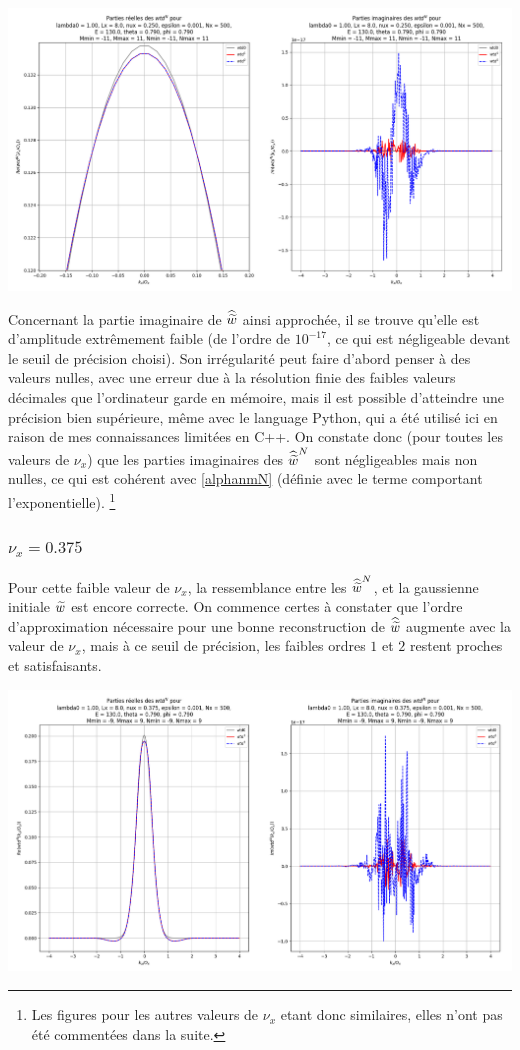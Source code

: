 \includegraphics[scale=0.35]{1-1.png}

\newpage

Concernant la partie imaginaire de $\widehat{\widetilde{w}}$ ainsi approchée, il se trouve qu'elle est d'amplitude extrêmement faible
(de l'ordre de $10^{-17}$, ce qui est négligeable devant le seuil de précision choisi). Son irrégularité peut faire
d'abord penser à des valeurs nulles, avec une erreur due à la résolution finie des faibles valeurs décimales
que l'ordinateur garde en mémoire,
mais il est possible d'atteindre une précision bien supérieure, même avec le language Python,
qui a été utilisé ici en raison de mes connaissances limitées en C++.
On constate donc (pour toutes les valeurs de $\nu_x$) que les parties imaginaires des $\widehat{\widetilde{w}}^N$ sont négligeables
mais non nulles, ce qui est cohérent avec \eqref{alphanmN} (définie avec le terme comportant l'exponentielle).
\footnote{Les figures pour les autres valeurs de $\nu_x$ etant donc similaires,
elles n'ont pas été commentées dans la suite.}


\subsubsection{$\nu_x = 0.375$}

Pour cette faible valeur de $\nu_x$, la ressemblance entre les $\widehat{\widetilde{w}}^N$, et la gaussienne initiale $\widetilde{w}$
est encore correcte.
On commence certes à constater que l'ordre d'approximation nécessaire pour une bonne reconstruction de $\widehat{\widetilde{w}}$
augmente avec la valeur de $\nu_x$, mais à ce seuil de précision, les faibles ordres $1$ et $2$ restent proches
et satisfaisants.

\includegraphics[scale=0.35]{2.png}

